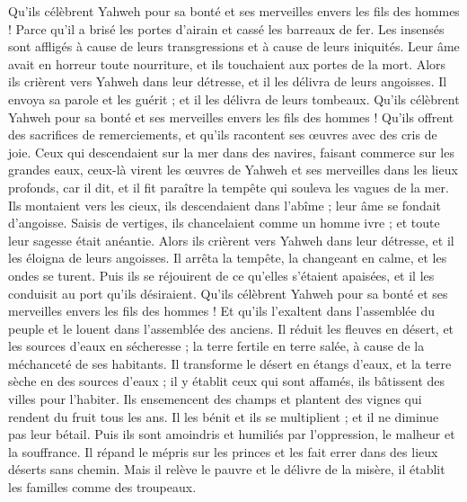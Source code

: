 \begin{multicols}{2}
Qu'ils célèbrent Yahweh pour sa bonté et ses merveilles envers les fils des hommes !
Parce qu'il a brisé les portes d'airain et cassé les barreaux de fer.
Les insensés sont affligés à cause de leurs transgressions et à cause de leurs iniquités.
Leur âme avait en horreur toute nourriture, et ils touchaient aux portes de la mort.
Alors ils crièrent vers Yahweh dans leur détresse, et il les délivra de leurs angoisses.
Il envoya sa parole et les guérit ; et il les délivra de leurs tombeaux.
Qu'ils célèbrent Yahweh pour sa bonté et ses merveilles envers les fils des hommes !
Qu'ils offrent des sacrifices de remerciements, et qu'ils racontent ses œuvres avec des cris de joie.
Ceux qui descendaient sur la mer dans des navires, faisant commerce sur les grandes eaux,
ceux-là virent les œuvres de Yahweh et ses merveilles dans les lieux profonds,
car il dit, et il fit paraître la tempête qui souleva les vagues de la mer.
Ils montaient vers les cieux, ils descendaient dans l’abîme ; leur âme se fondait d'angoisse.
Saisis de vertiges, ils chancelaient comme un homme ivre ; et toute leur sagesse était anéantie.
Alors ils crièrent vers Yahweh dans leur détresse, et il les éloigna de leurs angoisses.
Il arrêta la tempête, la changeant en calme, et les ondes se turent.
Puis ils se réjouirent de ce qu'elles s’étaient apaisées, et il les conduisit au port qu'ils désiraient.
Qu'ils célèbrent Yahweh pour sa bonté et ses merveilles envers les fils des hommes !
Et qu'ils l'exaltent dans l’assemblée du peuple et le louent dans l'assemblée des anciens.
Il réduit les fleuves en désert, et les sources d'eaux en sécheresse ;
la terre fertile en terre salée, à cause de la méchanceté de ses habitants.
Il transforme le désert en étangs d’eaux, et la terre sèche en des sources d'eaux ;
il y établit ceux qui sont affamés, ils bâtissent des villes pour l’habiter.
Ils ensemencent des champs et plantent des vignes qui rendent du fruit tous les ans.
Il les bénit et ils se multiplient ; et il ne diminue pas leur bétail.
Puis ils sont amoindris et humiliés par l'oppression, le malheur et la souffrance.
Il répand le mépris sur les princes et les fait errer dans des lieux déserts sans chemin.
Mais il relève le pauvre et le délivre de la misère, il établit les familles comme des troupeaux.

\end{multicols}
